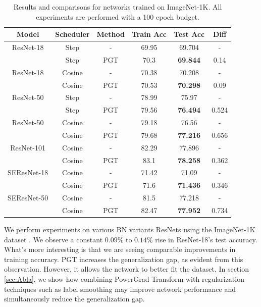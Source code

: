 \documentclass[times,sort&compress]{elsarticle}
\begin{document}
\begin{table}[t]
\centering
\caption{ Results and comparisons for networks trained on ImageNet-1K. All experiments
are performed with a 100 epoch budget. }
\label{tab:imagenet_table}
\vspace{5pt}
\begin{tabular}{cccccc}
\textbf{Model} & \textbf{Scheduler} & \textbf{Method} & \textbf{Train Acc} &
\textbf{Test Acc} & \textbf{Diff} \\
\midrule
ResNet-18 & Step & - & 69.95 & 69.704 & - \\
& Step & PGT & 70.3 & \textbf{69.844} & 0.14 \\
\midrule
ResNet-18 & Cosine & - & 70.38 & 70.208 & - \\
& Cosine & PGT & 70.53 & \textbf{70.298} & 0.09 \\
\midrule
ResNet-50 & Step & - & 78.99 & 75.97 & - \\
& Step & PGT & 79.56 & \textbf{76.494} & 0.524 \\
\midrule
ResNet-50 & Cosine & - & 79.18 & 76.56 & - \\
& Cosine & PGT & 79.68 & \textbf{77.216} & 0.656 \\
\midrule
ResNet-101 & Cosine & - & 82.29 & 77.896 & - \\
& Cosine & PGT & 83.1 & \textbf{78.258} & 0.362 \\
\midrule
SEResNet-18 & Cosine & - & 71.42 & 71.09 & - \\
& Cosine & PGT & 71.6 & \textbf{71.436} & 0.346 \\
\midrule
SEResNet-50 & Cosine & - & 81.5 & 77.218 & - \\
& Cosine & PGT & 82.47 & \textbf{77.952} & 0.734 \\
\end{tabular}
\end{table}






We perform experiments on various BN variants ResNets using the ImageNet-1K dataset
\cite{deng2009imagenet}. We observe a constant $0.09\%$ to $0.14\%$ rise in ResNet-18's
test accuracy. What's more interesting is that we are seeing comparable improvements in
training accuracy. PGT increases the generalization gap, as evident from this
observation. However, it allows the network to better fit the dataset. In section
\ref{sec:Abla}, we show how combining PowerGrad Transform with regularization techniques
such as label smoothing may improve network performance and simultaneously reduce the
generalization gap.
\end{document}

